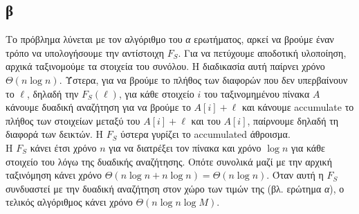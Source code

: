 \documentclass[12pt,a4paper]{article}
\begin{document}
  \subsection{β}
    Το πρόβλημα λύνεται με τον αλγόριθμο του \textit{α} ερωτήματος, αρκεί να
    βρούμε έναν τρόπο να υπολογήσουμε την αντίστοιχη \( F_S \). Για να πετύχουμε
    αποδοτική υλοποίηση, αρχικά ταξινομούμε τα στοιχεία του συνόλου. Η διαδικασία
    αυτή παίρνει χρόνο \( \Theta(n\log{n}) \). Ύστερα, για να βρούμε το πλήθος
    των διαφορών που δεν υπερβαίνουν το \( \ell \), δηλαδή την \( F_S(\ell) \),
    για κάθε στοιχείο \( i \) του ταξινομημένου πίνακα \( A\) κάνουμε δυαδική 
    αναζήτηση για να βρούμε το \( A[i] + \ell \) και κάνουμε {\latintext 
    accumulate} το πλήθος των στοιχείων μεταξύ του \( Α[i] + \ell \) και του 
    \( A[i] \), παίρνουμε δηλαδή τη διαφορά των δεικτών. Η \( F_S \) ύστερα 
    γυρίζει το {\latintext accumulated} άθροισμα.\\
    Η \( F_S \) κάνει έτσι χρόνο \( n \) για να διατρέξει τον πίνακα και 
    χρόνο \( \log{n} \) για κάθε στοιχείο του λόγω της δυαδικής αναζήτησης.
    Οπότε συνολικά μαζί με την αρχική ταξινόμηση κάνει χρόνο \( \Theta(n\log{n}
    + n\log{n})=\Theta(n\log{n}) \).
    Όταν αυτή η \( F_S \) συνδυαστεί με την δυαδική αναζήτηση στον χώρο των τιμών
    της (βλ. ερώτημα \textit{α}), ο τελικός αλγόριθμος κάνει χρόνο \( \Theta
    (n\log{n}\log{M}) \).
\end{document}
